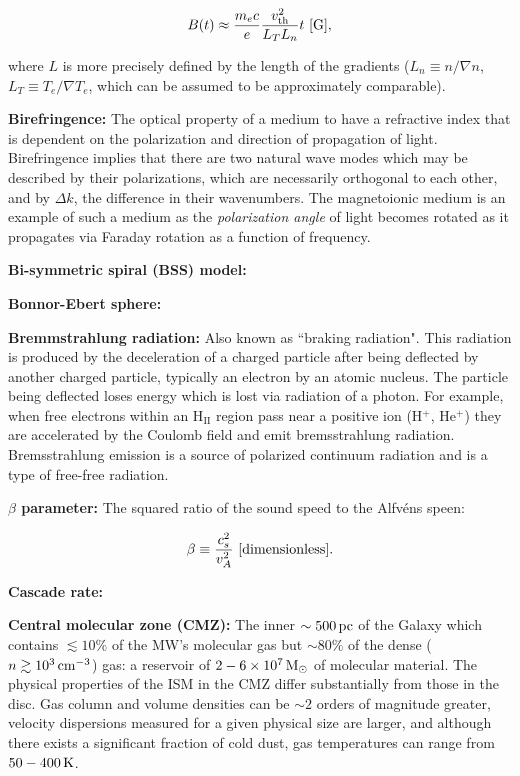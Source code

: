 \documentclass[a4paper,10pt]{article}
\begin{document}
\begin{align*}
    B(t) \approx \frac{m_ec}{e}\frac{v_{\rm th}^2}{L_TL_n}t ~ [{\rm G}],
\end{align*}

{\noindent}where $L$ is more precisely defined by the length of the gradients ($L_n\equiv n/\nabla n$, $L_T\equiv T_e/\nabla T_e$, which can be assumed to be approximately comparable).

{\noindent}\textbf{Birefringence:} The optical property of a medium to have a refractive index that is dependent on the polarization and direction of propagation of light. Birefringence implies that there are two natural wave modes which may be described by their polarizations, which are necessarily orthogonal to each other, and by $\Delta k$, the difference in their wavenumbers. The magnetoionic medium is an example of such a medium as the \textit{polarization angle} of light becomes rotated as it propagates via Faraday rotation as a function of frequency.

{\noindent}\textbf{Bi-symmetric spiral (BSS) model:}

{\noindent}\textbf{Bonnor-Ebert sphere:}

{\noindent}\textbf{Bremmstrahlung radiation:} Also known as ``braking radiation". This radiation is produced by the deceleration of a charged particle after being deflected by another charged particle, typically an electron by an atomic nucleus. The particle being deflected loses energy which is lost via radiation of a photon. For example, when free electrons within an H$_\mathrm{II}$ region pass near a positive ion (H$^+$, He$^+$) they are accelerated by the Coulomb field and emit bremsstrahlung radiation. Bremsstrahlung emission is a source of polarized continuum radiation and is a type of free-free radiation.

{\noindent}\textbf{$\beta$ parameter:} The squared ratio of the sound speed to the Alfv\'ens speen:

\begin{align*}
    \beta \equiv \frac{c_s^2}{v_A^2} ~ [{\rm dimensionless}].
\end{align*}

{\noindent}\textbf{Cascade rate:}

{\noindent}\textbf{Central molecular zone (CMZ):} The inner $\sim500\,{\rm pc}$ of the Galaxy which contains $\lesssim10\%$ of the MW's molecular gas but $\sim80\%$ of the dense ($n\gtrsim10^3\,{\rm cm^{-3}}$) gas: a reservoir of $2-6\times10^7\,{\rm M_\odot}$ of molecular material. The physical properties of the ISM in the CMZ differ substantially from those in the disc. Gas column and volume densities can be $\sim2$ orders of magnitude greater, velocity dispersions measured for a given physical size are larger, and although there exists a significant fraction of cold dust, gas temperatures can range from $50-400\,{\rm K}$.
\end{document}
